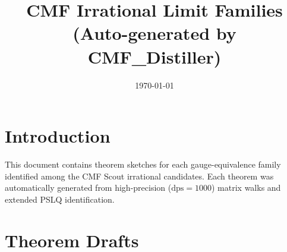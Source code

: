 \documentclass{amsart}
\title{CMF Irrational Limit Families \\ (Auto-generated by CMF\_Distiller)}
\date{\today}
\begin{document}
\maketitle
\section{Introduction}
This document contains theorem sketches for each gauge-equivalence family
identified among the CMF Scout irrational candidates. Each theorem was
automatically generated from high-precision ($\mathrm{dps}=1000$) matrix
walks and extended PSLQ identification.
\section{Theorem Drafts}


\end{document}
